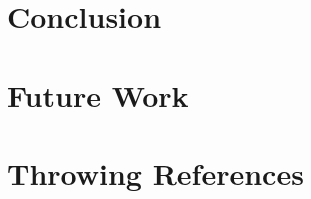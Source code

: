 \documentclass[conference]{IEEEtran}
\begin{document}
% 
% 


% 



\section{Conclusion}

\section{Future Work}

\section{Throwing References}
\end{document}
